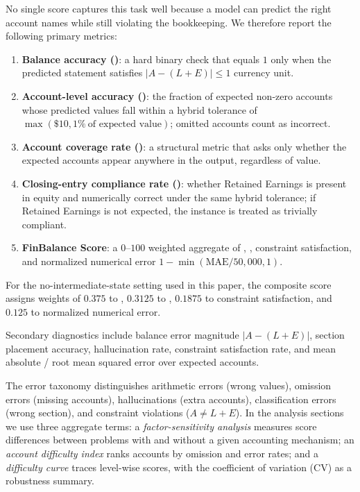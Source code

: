 No single score captures this task well because a model can predict the
right account names while still violating the bookkeeping.
We therefore report the following primary metrics:
\begin{enumerate}[leftmargin=*,topsep=2pt,itemsep=2pt]
  \item \textbf{Balance accuracy (\ba{})}: a hard binary check that
    equals \(1\) only when the predicted statement satisfies
    \(|A-(L+E)| \leq 1\) currency unit.
  \item \textbf{Account-level accuracy (\ala{})}: the fraction of
    expected non-zero accounts whose predicted values fall within a
    hybrid tolerance of \(\max(\$10, 1\%\ \text{of expected value})\);
    omitted accounts count as incorrect.
  \item \textbf{Account coverage rate (\acr{})}: a structural metric that
    asks only whether the expected accounts appear anywhere in the
    output, regardless of value.
  \item \textbf{Closing-entry compliance rate (\cecr{})}: whether
    Retained Earnings is present in equity and numerically correct under
    the same hybrid tolerance; if Retained Earnings is not expected, the
    instance is treated as trivially compliant.
  \item \textbf{FinBalance Score}: a \(0\)--\(100\) weighted aggregate of
    \ba{}, \ala{}, constraint satisfaction, and normalized numerical
    error \(1-\min(\text{MAE}/50{,}000, 1)\).
\end{enumerate}

For the no-intermediate-state setting used in this paper, the composite
score assigns weights of \(0.375\) to \ba{}, \(0.3125\) to \ala{},
\(0.1875\) to constraint satisfaction, and \(0.125\) to normalized
numerical error.

Secondary diagnostics include balance error magnitude
\(|A-(L+E)|\), section placement accuracy, hallucination rate,
constraint satisfaction rate, and mean absolute / root mean squared
error over expected accounts.

The error taxonomy distinguishes arithmetic errors (wrong values),
omission errors (missing accounts), hallucinations (extra accounts),
classification errors (wrong section), and constraint violations
(\(A \neq L + E\)).
In the analysis sections we use three aggregate terms:
a \emph{factor-sensitivity analysis} measures score differences between
problems with and without a given accounting mechanism;
an \emph{account difficulty index} ranks accounts by omission and error
rates; and
a \emph{difficulty curve} traces level-wise scores, with the
coefficient of variation (CV) as a robustness summary.
